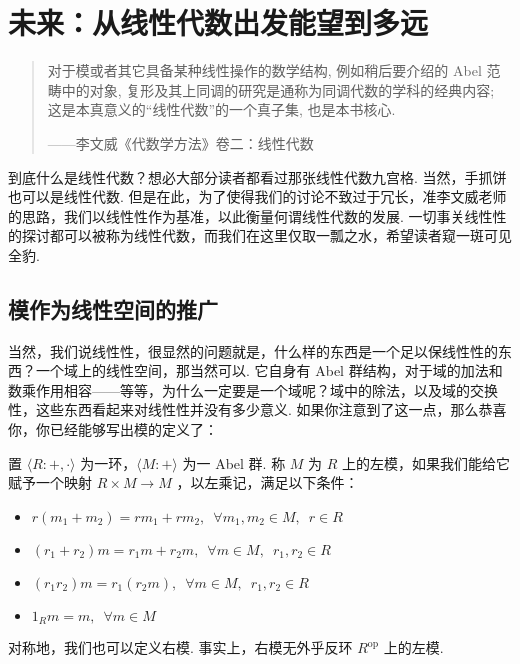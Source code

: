 \section{未来：从线性代数出发能望到多远}

\begin{quote}

    \kaishu
    对于模或者其它具备某种线性操作的数学结构, 例如稍后要介绍的 Abel 范畴中的对象, 复形及其上同调的研究是通称为同调代数的学科的经典内容; 这是本真意义的``线性代数''的一个真子集, 也是本书核心.

    \begin{flushright}
        \kaishu
        ——李文威《代数学方法》卷二：线性代数
    \end{flushright}

\end{quote}

到底什么是线性代数？想必大部分读者都看过那张线性代数九宫格. 当然，手抓饼也可以是线性代数. 但是在此，为了使得我们的讨论不致过于冗长，准李文威老师的思路，我们以线性性作为基准，以此衡量何谓线性代数的发展. 一切事关线性性的探讨都可以被称为线性代数，而我们在这里仅取一瓢之水，希望读者窥一斑可见全豹.

\subsection{模作为线性空间的推广}

当然，我们说线性性，很显然的问题就是，什么样的东西是一个足以保线性性的东西？一个域上的线性空间，那当然可以. 它自身有 Abel 群结构，对于域的加法和数乘作用相容——等等，为什么一定要是一个域呢？域中的除法，以及域的交换性，这些东西看起来对线性性并没有多少意义. 如果你注意到了这一点，那么恭喜你，你已经能够写出模的定义了：

\begin{definition}
    置 $\langle R : +, \cdot \rangle$ 为一环，$\langle M : + \rangle$ 为一 Abel 群. 称 $M$ 为 $R$ 上的左模，如果我们能给它赋予一个映射 $R \times M \to M$ ，以左乘记，满足以下条件：

    \begin{itemize}
        \item $r(m_1 + m_2) = rm_1 + rm_2,\enspace \forall m_1, m_2 \in M,\enspace r \in R$

        \item $(r_1 + r_2)m = r_1m + r_2m,\enspace \forall m \in M,\enspace r_1, r_2 \in R$

        \item $(r_1r_2)m = r_1(r_2m),\enspace \forall m \in M,\enspace r_1, r_2 \in R$

        \item $1_Rm = m,\enspace \forall m \in M$
    \end{itemize}

    对称地，我们也可以定义右模. 事实上，右模无外乎反环 $R^{\mathrm{op}}$ 上的左模.
\end{definition}

